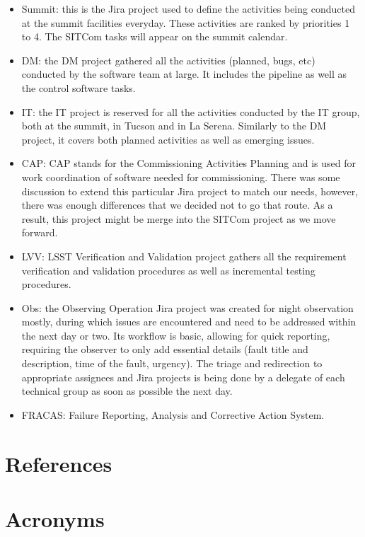 \documentclass[SE,authoryear,toc]{lsstdoc}
\begin{document}
\begin{itemize}
\item Summit: this is the Jira project used to define the activities being conducted at the summit facilities everyday. These activities are ranked by priorities 1 to 4.  The SITCom tasks will appear on the summit calendar.
\item DM: the DM project gathered all the activities (planned, bugs, etc) conducted by the software team at large. It includes the pipeline as well as the control software tasks. 
\item IT: the IT project is reserved for all the activities conducted by the IT group, both at the summit, in Tucson and in La Serena. Similarly to the DM project, it covers both planned activities as well as emerging issues. 
\item CAP: CAP stands for the Commissioning Activities Planning and is used for work coordination of software needed for commissioning. There was some discussion to extend this particular Jira project to match our needs, however, there was enough differences that we decided not to go that route. As a result, this project might be merge into the SITCom project as we move forward.  
\item LVV: LSST Verification and Validation project gathers all the requirement verification and validation procedures as well as incremental testing procedures.
\item Obs: the Observing Operation Jira project was created for night observation mostly, during which issues are encountered and need to be addressed within the next day or two. Its workflow is basic, allowing for quick reporting, requiring the observer to only add essential details (fault title and description, time of the fault, urgency). The triage and redirection to appropriate assignees and Jira projects is being done by a delegate of each technical group as soon as possible the next day.
\item FRACAS: Failure Reporting, Analysis and Corrective Action System. 
\end{itemize}


\appendix
\section{References} \label{sec:bib}
%

\section{Acronyms} \label{sec:acronyms}

\end{document}
